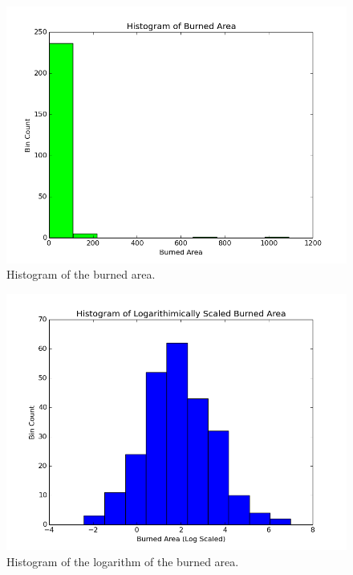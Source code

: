 \documentclass[12pt]{article}
\begin{document}
	\begin{figure}[!htb]
	\begin{center}
	  \includegraphics[scale=0.5]{histogram-burned.png}
	  \caption{Histogram of the burned area.}
	\end{center}
	\end{figure}

	\begin{figure}[!htb]
	\begin{center}
	  \includegraphics[scale=0.5]{log-histogram-burned.png}
	  \caption{Histogram of the logarithm of the burned area.}
	\end{center}
	\end{figure}
\end{document}
